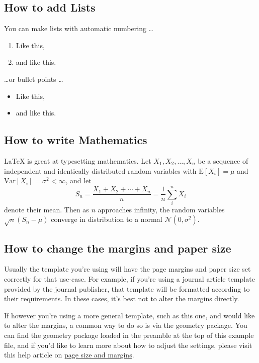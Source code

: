 \documentclass{article}
\begin{document}
\subsection{How to add Lists}

You can make lists with automatic numbering \dots

\begin{enumerate}
    \item Like this,
    \item and like this.
\end{enumerate}
\dots or bullet points \dots
\begin{itemize}
    \item Like this,
    \item and like this.
\end{itemize}

\subsection{How to write Mathematics}

\LaTeX{} is great at typesetting mathematics. Let $X_1, X_2, \ldots, X_n$ be a sequence of independent and identically distributed random variables with $\text{E}[X_i] = \mu$ and $\text{Var}[X_i] = \sigma^2 < \infty$, and let
\[S_n = \frac{X_1 + X_2 + \cdots + X_n}{n}
= \frac{1}{n}\sum_{i}^{n} X_i\]
denote their mean. Then as $n$ approaches infinity, the random variables $\sqrt{n}(S_n - \mu)$ converge in distribution to a normal $\mathcal{N}(0, \sigma^2)$.

\subsection{How to change the margins and paper size}

Usually the template you're using will have the page margins and paper size set correctly for that use-case. For example, if you're using a journal article template provided by the journal publisher, that template will be formatted according to their requirements. In these cases, it's best not to alter the margins directly.

If however you're using a more general template, such as this one, and would like to alter the margins, a common way to do so is via the geometry package. You can find the geometry package loaded in the preamble at the top of this example file, and if you'd like to learn more about how to adjust the settings, please visit this help article on \href{https://www.overleaf.com/learn/latex/page_size_and_margins}{page size and margins}.
\end{document}
